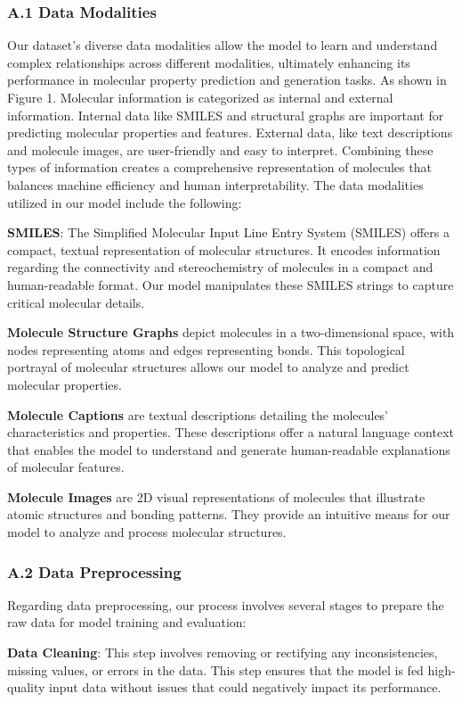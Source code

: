 \documentclass{article}
\begin{document}
\subsubsection*{A.1 Data Modalities}
Our dataset's diverse data modalities allow the model to learn and understand complex relationships across different modalities, ultimately enhancing its performance in molecular property prediction and generation tasks. As shown in Figure 1. Molecular information is categorized as internal and external information. Internal data like SMILES and structural graphs are important for predicting molecular properties and features. External data, like text descriptions and molecule images, are user-friendly and easy to interpret. Combining these types of information creates a comprehensive representation of molecules that balances machine efficiency and human interpretability. The data modalities utilized in our model include the following:

\textbf{SMILES}: The Simplified Molecular Input Line Entry System (SMILES) offers a compact, textual representation of molecular structures. It encodes information regarding the connectivity and stereochemistry of molecules in a compact and human-readable format. Our model manipulates these SMILES strings to capture critical molecular details.
 
\textbf{Molecule Structure Graphs} depict molecules in a two-dimensional space, with nodes representing atoms and edges representing bonds. This topological portrayal of molecular structures allows our model to analyze and predict molecular properties.
 
\textbf{Molecule Captions} are textual descriptions detailing the molecules' characteristics and properties. These descriptions offer a natural language context that enables the model to understand and generate human-readable explanations of molecular features.
 
\textbf{Molecule Images} are 2D visual representations of molecules that illustrate atomic structures and bonding patterns. They provide an intuitive means for our model to analyze and process molecular structures.
\subsubsection*{A.2 Data Preprocessing}

Regarding data preprocessing, our process involves several stages to prepare the raw data for model training and evaluation:
 
\textbf{Data Cleaning}: This step involves removing or rectifying any inconsistencies, missing values, or errors in the data. This step ensures that the model is fed high-quality input data without issues that could negatively impact its performance.
 
\end{document}

